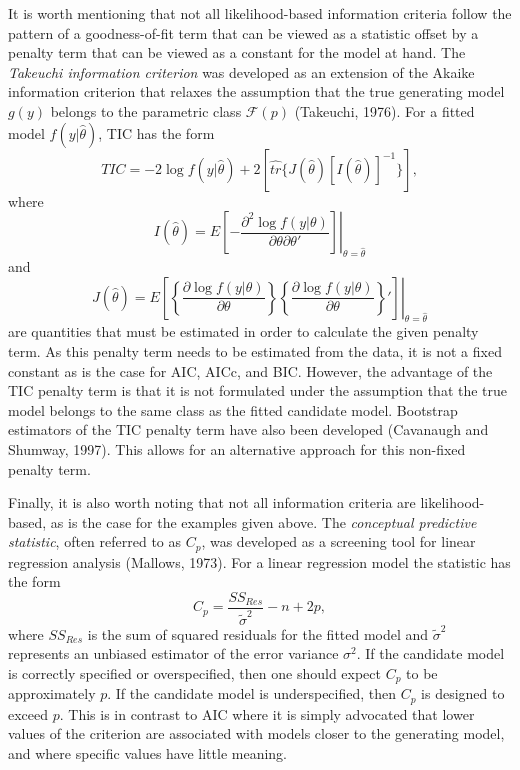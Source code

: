 		It is worth mentioning that not all likelihood-based information criteria follow the pattern of a goodness-of-fit term that can be viewed as a statistic offset by a penalty term that
		can be viewed as a constant for the model at hand. The \textit{Takeuchi information criterion} was developed as an extension of the Akaike information criterion that relaxes the
		assumption that the true generating model $g(y)$ belongs to the parametric class $\mathcal{F}(p)$ (Takeuchi, 1976). For a fitted model $f(y|\hat{\theta})$, TIC has the form
		\begin{equation}
			TIC = -2 \log f(y|\hat{\theta}) + 2 \left[ \hat{tr} \{ J(\hat{\theta}) [I(\hat{\theta})]^{-1} \} \right] ,
		\end{equation}
		where
		\begin{equation}
			I(\hat{\theta}) = E \left. \left[ -\frac{\partial^2 \log f(y|\theta)}{\partial \theta \partial \theta '} \right] \right|_{\theta = \hat{\theta}}
		\end{equation}
		and
		\begin{equation}
			J(\hat{\theta}) = E \left. \left[ \left\{ \frac{\partial \log f(y|\theta)}{\partial \theta} \right\} \left\{ \frac{\partial \log f(y|\theta)}{\partial \theta} \right\}'  \right] \right|_{\theta = \hat{\theta}}
		\end{equation}
		are quantities that must be estimated in order to calculate the given penalty term. As this penalty term needs to be estimated from the data, it is not a fixed constant as is the case
		for AIC, AICc, and BIC. However, the advantage of the TIC penalty term is that it is not formulated under the assumption that the true model belongs to the same class as the fitted candidate
		model. Bootstrap estimators of the TIC penalty term have also been developed (Cavanaugh and Shumway, 1997). This allows for an alternative approach for this non-fixed penalty term.

		Finally, it is also worth noting that not all information criteria are likelihood-based, as is the case for the examples given above. The \textit{conceptual predictive statistic}, often
		referred to as $C_p$, was developed as a screening tool for linear regression analysis (Mallows, 1973). For a linear regression model the statistic has the form
		\begin{equation}
			C_p = \frac{SS_{Res}}{\tilde{\sigma}^2} - n + 2p ,
		\end{equation}
		where $SS_{Res}$ is the sum of squared residuals for the fitted model and $\tilde{\sigma}^2$ represents an unbiased estimator of the error variance $\sigma^2$. If the candidate model is correctly
		specified or overspecified, then one should expect $C_p$ to be approximately $p$. If the candidate model is underspecified, then $C_p$ is designed to exceed $p$. This is in contrast to AIC
		where it is simply advocated that lower values of the criterion are associated with models closer to the generating model, and where specific values have little meaning.
		
